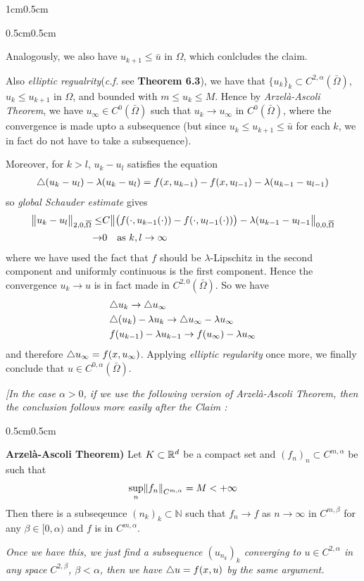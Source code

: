 \documentclass[12pt,a4paper]{article}
\newenvironment{proof}
{\begin{changemargin}{1cm}{0.5cm} 
	}%
	{\end{changemargin}
}
\newenvironment{subproof}
{\begin{changemargin}{0.5cm}{0.5cm} 
	}%
	{\end{changemargin}
}
\newenvironment{p}
{\begin{proof} 
	}%
	{\end{proof}
}
\begin{document}
\begin{p}
\begin{subproof}
\quad Analogously, we also have $u_{k+1} \leq \bar{u}$ in $\Omega$, which conlcludes the claim.
\end{subproof}

Also \emph{elliptic regualrity}(\textit{c.f.} see \textbf{Theorem 6.3}), we have that $\{u_k\}_k \subset C^{2, \alpha}(\bar{\Omega})$, $u_k \leq u_{k+1}$ in $\Omega$, and bounded with $m\leq u_k \leq M$. Hence by \emph{Arzel\`a-Ascoli Theorem}, we have $u_{\infty} \in C^{0}(\bar{\Omega})$ such that $u_k \rightarrow u_{\infty}$ in $C^0(\bar{\Omega})$, where the convergence is made upto a subsequence (but since $u_k \leq u_{k+1} \leq \bar{u}$ for each $k$, we in fact do not have to take a subsequence).

\quad Moreover, for $k>l$, $u_k -u_l$ satisfies the equation
\begin{align*}
\triangle (u_k - u_l) - \lambda(u_k -u_l) = f(x, u_{k-1}) - f(x, u_{l-1}) - \lambda(u_{k-1}- u_{l-1})
\end{align*}
so \emph{global Schauder estimate} gives
\begin{align*}
\bigl\lVert u_k - u_l\bigr\rVert_{2, 0, \overline{\Omega}} \leq & C \bigl\lVert \big( f(\cdot, u_{k-1}(\cdot)) - f(\cdot, u_{l-1}(\cdot)) \big) - \lambda (u_{k-1} - u_{l-1}\bigr\rVert_{0, 0, \overline{\Omega}} \\
\rightarrow & 0 \quad \text{as } k,l\rightarrow \infty
\end{align*}
where we have used the fact that $f$ should be $\lambda$-Lipschitz in the second component and uniformly continuous is the first component. Hence the convergence $u_k \rightarrow u$ is in fact made in $C^{2,0}(\bar{\Omega})$. So we have
\begin{align*}
& \triangle u_{k} \rightarrow \triangle u_{\infty}\\
& \triangle(u_{k}) - \lambda u_{k} \rightarrow \triangle u_{\infty} - \lambda u_{\infty} \\
& f(u_{k-1}) - \lambda u_{k-1} \rightarrow f(u_{\infty}) - \lambda u_{\infty}
\end{align*}
and therefore $\triangle u_{\infty} = f(x, u_{\infty})$. Applying \emph{elliptic regularity} once more, we finally conclude that $u\in C^{0, \alpha}(\bar{\Omega})$.
\s

\emph{[In the case $\alpha>0$, if we use the following version of Arzel\`a-Ascoli Theorem, then the conclusion follows more easily after the Claim :}
\begin{subproof}
\textbf{Arzel\`a-Ascoli Theorem)} Let $K \subset \mathbb{R}^d$ be a compact set and $(f_n)_n \subset C^{m, \alpha}$ be such that
\begin{align*}
\sup_{n} \snorms{f_n}{C^{m, \alpha}} = M < +\infty
\end{align*} 
Then there is a subseqeunce $(n_k)_k \subset \mathbb{N}$ such that $f_n \rightarrow f$ as $n\rightarrow \infty$ in $C^{m, \beta}$ for any $\beta \in [0, \alpha)$ and $f$ is in $C^{m, \alpha}$.
\end{subproof}
\emph{Once we have this, we just find a subsequence $(u_{n_k})_k$ converging to $u \in C^{2, \alpha}$ in any space $C^{2, \beta}$, $\beta < \alpha$, then we have $\triangle u = f(x, u)$ by the same argument.}
\s


\end{p}
\end{document}
